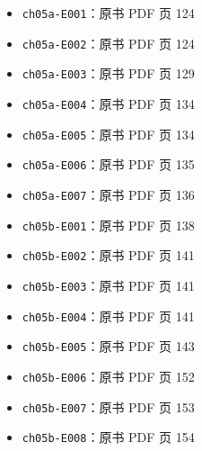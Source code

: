 \documentclass[
  10pt,
  fontset=fandol]{ctexart}
\providecommand{\tightlist}{%
  \setlength{\itemsep}{0pt}\setlength{\parskip}{0pt}}
\begin{document}
\begin{itemize}
\tightlist
\item
  \texttt{ch05a-E001}：原书 PDF 页 124
\item
  \texttt{ch05a-E002}：原书 PDF 页 124
\item
  \texttt{ch05a-E003}：原书 PDF 页 129
\item
  \texttt{ch05a-E004}：原书 PDF 页 134
\item
  \texttt{ch05a-E005}：原书 PDF 页 134
\item
  \texttt{ch05a-E006}：原书 PDF 页 135
\item
  \texttt{ch05a-E007}：原书 PDF 页 136
\item
  \texttt{ch05b-E001}：原书 PDF 页 138
\item
  \texttt{ch05b-E002}：原书 PDF 页 141
\item
  \texttt{ch05b-E003}：原书 PDF 页 141
\item
  \texttt{ch05b-E004}：原书 PDF 页 141
\item
  \texttt{ch05b-E005}：原书 PDF 页 143
\item
  \texttt{ch05b-E006}：原书 PDF 页 152
\item
  \texttt{ch05b-E007}：原书 PDF 页 153
\item
  \texttt{ch05b-E008}：原书 PDF 页 154
\end{itemize}
\end{document}
